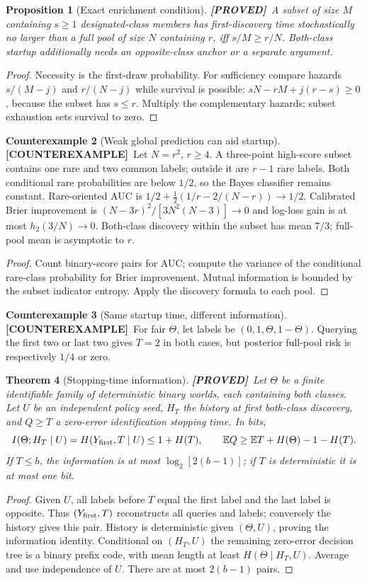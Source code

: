 \documentclass[11pt]{article}
\newtheorem{theorem}{Theorem}[section]
\newtheorem{proposition}[theorem]{Proposition}
\theoremstyle{definition}
\newtheorem{example}[theorem]{Counterexample}
\newcommand{\E}{\mathbb E}
\newcommand{\1}{\mathbf 1}
\newcommand{\pr}{\textbf{[PROVED]}}
\newcommand{\ce}{\textbf{[COUNTEREXAMPLE]}}
\begin{document}
\begin{proposition}[Exact enrichment condition]\label{prop:tail}
\pr\ A subset of size $M$ containing $s\ge1$ designated-class members has
first-discovery time stochastically no larger than a full pool of size $N$
containing $r$, iff $s/M\ge r/N$.
Both-class startup additionally needs an opposite-class anchor or a separate
argument.
\end{proposition}
\begin{proof}
Necessity is the first-draw probability. For sufficiency compare hazards
$s/(M-j)$ and $r/(N-j)$ while survival is possible:
$sN-rM+j(r-s)\ge0$, because the subset has $s\le r$.
Multiply the complementary hazards; subset exhaustion sets survival to zero.
\end{proof}
\begin{example}[Weak global prediction can aid startup]\label{ex:startup}
\ce\ Let $N=r^2$, $r\ge4$. A three-point high-score subset contains one
rare and two common labels; outside it are $r-1$ rare labels.
Both conditional rare probabilities are below $1/2$, so the Bayes classifier
remains constant. Rare-oriented AUC is
$1/2+\frac12(1/r-2/(N-r))\to1/2$.
Calibrated Brier improvement is $(N-3r)^2/[3N^2(N-3)]\to0$ and log-loss
gain is at most $h_2(3/N)\to0$.
Both-class discovery within the subset has mean $7/3$; full-pool mean is
asymptotic to $r$.
\end{example}
\begin{proof}
Count binary-score pairs for AUC; compute the variance of the conditional
rare-class probability for Brier improvement. Mutual information is bounded
by the subset indicator entropy. Apply the discovery formula to each pool.
\end{proof}
\begin{example}[Same startup time, different information]\label{ex:history}
\ce\ For fair $\Theta$, let labels be $(0,1,\Theta,1-\Theta)$.
Querying the first two or last two gives $T=2$ in both cases, but posterior
full-pool risk is respectively $1/4$ or zero.
\end{example}
\begin{theorem}[Stopping-time information]\label{th:stop}
\pr\ Let $\Theta$ be a finite identifiable family of deterministic binary
worlds, each containing both classes. Let $U$ be an independent policy
seed, $H_T$ the history at first both-class discovery, and $Q\ge T$ a
zero-error identification stopping time. In bits,
\[
 I(\Theta;H_T\mid U)=H(Y_{\rm first},T\mid U)\le1+H(T),\qquad
 \E Q\ge\E T+H(\Theta)-1-H(T).
\]
If $T\le b$, the information is at most $\log_2[2(b-1)]$;
if $T$ is deterministic it is at most one bit.
\end{theorem}
\begin{proof}
Given $U$, all labels before $T$ equal the first label and the last label
is opposite. Thus $(Y_{\rm first},T)$ reconstructs all queries and labels;
conversely the history gives this pair. History is deterministic given
$(\Theta,U)$, proving the information identity.
Conditional on $(H_T,U)$ the remaining zero-error decision tree is a binary
prefix code, with mean length at least $H(\Theta\mid H_T,U)$.
Average and use independence of $U$. There are at most $2(b-1)$ pairs.
\end{proof}
\end{document}
